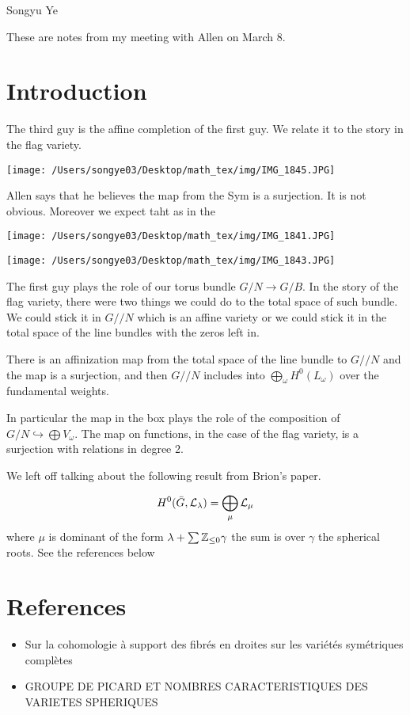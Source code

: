 \documentclass[12pt]{article}
\begin{document}
Songyu Ye

These are notes from my meeting with Allen on March 8.

\section{Introduction}

The third guy is the affine completion of the first guy. We 
relate it to the story in the flag variety.

\begin{center}
    \texttt{[image: /Users/songye03/Desktop/math\_tex/img/IMG\_1845.JPG]}
\end{center}
Allen says that he believes the map from the Sym is a surjection. It is not obvious.
Moreover we expect taht as in the 
\begin{center}
    \texttt{[image: /Users/songye03/Desktop/math\_tex/img/IMG\_1841.JPG]}
\end{center}

\begin{center}
    \texttt{[image: /Users/songye03/Desktop/math\_tex/img/IMG\_1843.JPG]}
\end{center}
The first guy plays the role of our torus bundle $G/N \to G/B$. In the story of the flag
variety, there were two things we could do to the total space of such bundle. We could stick it in 
$G//N$ which is an affine variety or we could stick it in the total space of the line bundles with the zeros left in.

There is an affinization map from the total space of the line bundle to $G//N$ and the map is a surjection,
and then $G//N$ includes into $\bigoplus_{\omega}H^0(L_{\omega})$ over the fundamental weights.

\hfill

In particular the map in the box plays the role of the composition of $G/N \hookrightarrow \bigoplus V_\omega$.
The map on functions, in the case of the flag variety, is a surjection with relations in degree 2.

\hfill

We left off talking about the following result from Brion's paper. 

\begin{align*}
    H^0(\bar{G},{\mathcal{L}}_{\lambda}) = \bigoplus_{\mu} {\mathcal{L}}_{\mu}
\end{align*} where $\mu$ is dominant of the form $\lambda + \sum \mathbb{Z}_{\leq 0}\gamma$
 the sum is over $\gamma$ the spherical roots. See the references below

\section{References}
\begin{itemize}
    \item Sur la cohomologie à support des fibrés en droites sur les variétés symétriques complètes
    \item GROUPE DE PICARD ET NOMBRES CARACTERISTIQUES DES VARIETES SPHERIQUES
\end{itemize}
\end{document}
